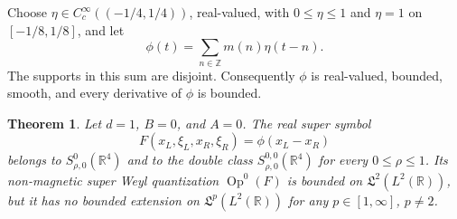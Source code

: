 \documentclass[11pt]{article}
\newtheorem{theorem}{Theorem}
\newcommand{\Z}{\mathbb Z}
\newcommand{\R}{\mathbb R}
\newcommand{\Sp}{\mathfrak L}
\begin{document}
Choose $\eta\in C_c^\infty((-1/4,1/4))$, real-valued, with
$0\leq\eta\leq1$ and $\eta=1$ on $[-1/8,1/8]$, and let
\begin{equation}\label{eq:phi}
  \phi(t)=\sum_{n\in\Z}m(n)\eta(t-n).
\end{equation}
The supports in this sum are disjoint.  Consequently $\phi$ is real-valued,
bounded, smooth, and every derivative of $\phi$ is bounded.

\begin{theorem}\label{thm:counterexample}
Let $d=1$, $B=0$, and $A=0$.  The real super symbol
\begin{equation}\label{eq:F}
  F(x_L,\xi_L,x_R,\xi_R)=\phi(x_L-x_R)
\end{equation}
belongs to $S^0_{\rho,0}(\R^4)$ and to the double class
$S^{0,0}_{\rho,0}(\R^4)$ for every $0\leq\rho\leq1$.  Its non-magnetic super
Weyl quantization $\operatorname{Op}^0(F)$ is bounded on
$\Sp^2(L^2(\R))$, but it has no bounded extension on
$\Sp^p(L^2(\R))$ for any $p\in[1,\infty]$, $p\ne2$.
\end{theorem}
\end{document}
